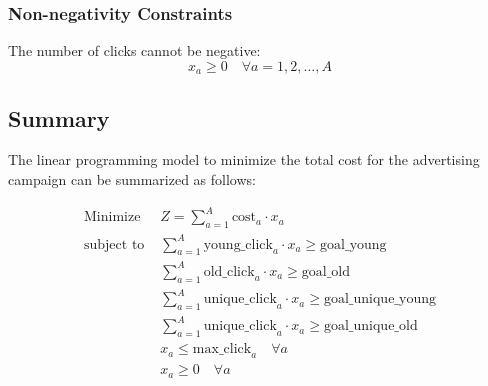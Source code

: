 \documentclass{article}
\begin{document}
\subsubsection*{Non-negativity Constraints}
The number of clicks cannot be negative:
\[
x_a \geq 0 \quad \forall a = 1, 2, \ldots, A
\]

\subsection*{Summary}
The linear programming model to minimize the total cost for the advertising campaign can be summarized as follows:

\begin{align*}
\text{Minimize } & Z = \sum_{a=1}^{A} \text{cost}_a \cdot x_a \\
\text{subject to } & \sum_{a=1}^{A} \text{young\_click}_{a} \cdot x_a \geq \text{goal\_young} \\
& \sum_{a=1}^{A} \text{old\_click}_{a} \cdot x_a \geq \text{goal\_old} \\
& \sum_{a=1}^{A} \text{unique\_click}_{a} \cdot x_a \geq \text{goal\_unique\_young} \\
& \sum_{a=1}^{A} \text{unique\_click}_{a} \cdot x_a \geq \text{goal\_unique\_old} \\
& x_a \leq \text{max\_click}_{a} \quad \forall a \\
& x_a \geq 0 \quad \forall a
\end{align*}
\end{document}
